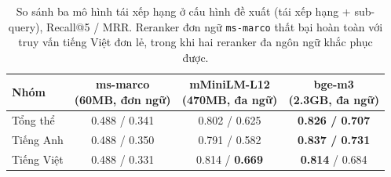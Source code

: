 \begin{table}[htbp]
\centering
\caption{So sánh ba mô hình tái xếp hạng ở cấu hình đề xuất (tái xếp hạng +
sub-query), Recall@5 / MRR. Reranker đơn ngữ \texttt{ms-marco} thất bại hoàn toàn
với truy vấn tiếng Việt đơn lẻ, trong khi hai reranker đa ngôn ngữ khắc phục được.}
\label{tab:reranker-3way}
\begin{tabular}{lccc}
\toprule
Nhóm & \makecell{ms-marco\\(60MB, đơn ngữ)} & \makecell{mMiniLM-L12\\(470MB, đa ngữ)} & \makecell{bge-m3\\(2.3GB, đa ngữ)} \\
\midrule
Tổng thể   & 0.488 / 0.341 & 0.802 / 0.625 & \textbf{0.826 / 0.707} \\
Tiếng Anh  & 0.488 / 0.350 & 0.791 / 0.582 & \textbf{0.837 / 0.731} \\
Tiếng Việt & 0.488 / 0.331 & 0.814 / \textbf{0.669} & \textbf{0.814} / 0.684 \\
\bottomrule
\end{tabular}
\end{table}
